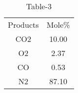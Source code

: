 \begin{table}[htbp]
      \centering
      \begin{tabular}{c|c}
      Products & Mole\%\\
        CO2   & 10.00 \\
        O2    & 2.37 \\
        CO    & 0.53 \\
        N2    & 87.10 \\
        
      \end{tabular}
      \caption{Table-3}
      \label{tab:tables/Table3.tex}
  \end{table}